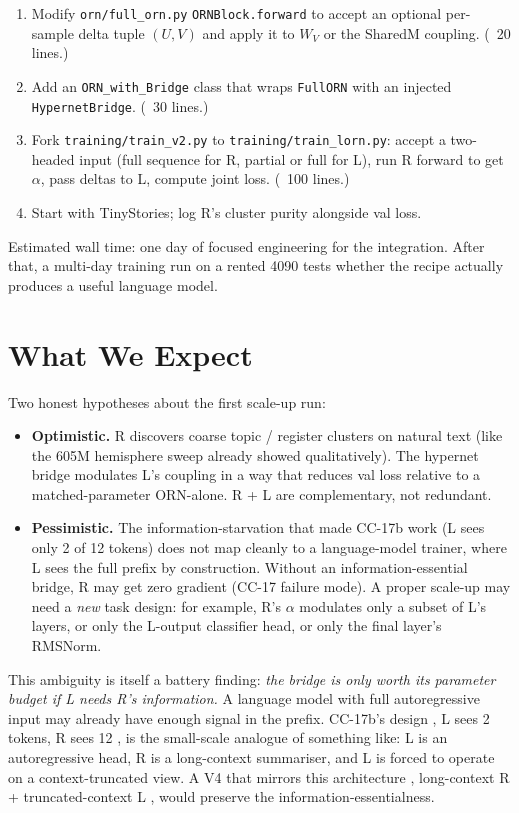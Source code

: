 \documentclass[10pt, twocolumn, a4paper]{article}
\begin{document}
\begin{enumerate}[nosep,leftmargin=*]
\item Modify \texttt{orn/full\_orn.py} \texttt{ORNBlock.forward} to accept an optional per-sample delta tuple $(U, V)$ and apply it to $W_V$ or the SharedM coupling. (~20 lines.)
\item Add an \texttt{ORN\_with\_Bridge} class that wraps \texttt{FullORN} with an injected \texttt{HypernetBridge}. (~30 lines.)
\item Fork \texttt{training/train\_v2.py} to \texttt{training/train\_lorn.py}: accept a two-headed input (full sequence for R, partial or full for L), run R forward to get $\alpha$, pass deltas to L, compute joint loss. (~100 lines.)
\item Start with TinyStories; log R's cluster purity alongside val loss.
\end{enumerate}

Estimated wall time: one day of focused engineering for the integration. After that, a multi-day training run on a rented 4090 tests whether the recipe actually produces a useful language model.

\section{What We Expect}

Two honest hypotheses about the first scale-up run:

\begin{itemize}[nosep,leftmargin=*]
\item \textbf{Optimistic.} R discovers coarse topic / register clusters on natural text (like the 605M hemisphere sweep already showed qualitatively). The hypernet bridge modulates L's coupling in a way that reduces val loss relative to a matched-parameter ORN-alone. R + L are complementary, not redundant.
\item \textbf{Pessimistic.} The information-starvation that made CC-17b work (L sees only 2 of 12 tokens) does not map cleanly to a language-model trainer, where L sees the full prefix by construction. Without an information-essential bridge, R may get zero gradient (CC-17 failure mode). A proper scale-up may need a \emph{new} task design: for example, R's $\alpha$ modulates only a subset of L's layers, or only the L-output classifier head, or only the final layer's RMSNorm.
\end{itemize}

This ambiguity is itself a battery finding: \emph{the bridge is only worth its parameter budget if L needs R's information.} A language model with full autoregressive input may already have enough signal in the prefix. CC-17b's design ,  L sees 2 tokens, R sees 12 ,  is the small-scale analogue of something like: L is an autoregressive head, R is a long-context summariser, and L is forced to operate on a context-truncated view. A V4 that mirrors this architecture ,   long-context R + truncated-context L ,  would preserve the information-essentialness.
\end{document}

